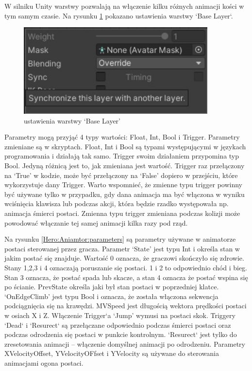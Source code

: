 \documentclass[12pt,twoside]{article}
\begin{document}
W silniku Unity warstwy pozwalają na włączenie kilku różnych animacji kości w tym
samym czasie. Na rysunku \ref{Hero:Aniamtor:BaseLayerSettings} pokazano
ustawienia warstwy `Base Layer`. 

\begin{figure}[!ht]
    \centering
	\includegraphics[width=10cm]{RealizacjaProjektu/UnityPictires/Animator/Player1_Animator_BaseLayer_settings.jpg}
	\caption{ustawienia warstwy `Base Layer'}
    \label{Hero:Aniamtor:BaseLayerSettings}
\end{figure}


Parametry mogą przyjąć 4 typy wartości: Float, Int, Bool i Trigger. Parametry
zmieniane są w skryptach. Float, Int i Bool są typami występującymi w językach
programowania i działają tak samo. Trigger swoim działaniem przypomina typ Bool.
Jedyną różnicą jest to, jak zmieniana jest wartość. Trigger raz przełączony na
`True' w kodzie, może być przełączony na `False' dopiero w przejściu, które
wykorzystuje dany Trigger. Warto wspomnieć, że zmienne typu trigger powinny być
używane tylko w przypadku, gdy dana animacja ma być włączona w wyniku wciśnięcia
klawisza lub podczas akcji, która będzie rzadko występowała np. animacja
śmierci postaci. Zmienna typu trigger zmieniana podczas kolizji może powodować
włączanie tej samej animacji kilka razy pod rząd.

Na rysunku \ref{Hero:Aniamtor:parameters} są parametry używane w animatorze
postaci sterowanej przez gracza. Parametr `State' jest typu Int i określa stan w
jakim postać się znajduje. Wartość 0 oznacza, że graczowi skończyło się zdrowie.
Stany 1,2,3 i 4 oznaczają poruszanie się postaci. 1 i 2 to odpowiednio chód i
bieg. Stan 3 oznacza, że postać spada lub skacze, a stan 4 oznacza że postać
wspina się po ścianie. PrevState określa jaki był stan postaci w poprzedniej
klatce. `OnEdgeClimb' jest typu Bool  i oznacza, że została włączona sekwencja
podciągnięcia się na krawędzi. MVSpeed jest długością wektora prędkości postaci
w osiach X i Z. Włączenie Trigger`a `Jump' wymusi na postaci skok. Triggery `Dead`
i `Resurect` są przełączane odpowiednio podczas śmierci postaci oraz podczas
odrodzenia się postaci w punkcie kontrolnym. `Resurect` jest tylko do
zresetowania animacji --  włączenie domyślnej animacji po odrodzeniu. Parametry
XVelocityOffset, YVelocityOFfset i YVelocity są używane do sterowania animacjami
ogona postaci. 
\end{document}
